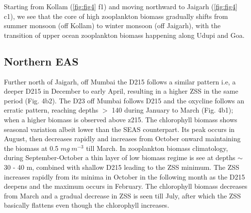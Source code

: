 \documentclass{article}
\begin{document}
	Starting from Kollam (\cref{fig:fig4} f1) and moving northward to Jaigarh (\cref{fig:fig4} c1), we see that the core of high zooplankton biomass gradually shifts from summer monsoon (off Kollam) to winter monsoon (off Jaigarh), with the transition of upper ocean zooplankton biomass happening along Udupi and Goa. 
	 
	\subsection{Northern EAS}
	Further north of Jaigarh, off Mumbai the D215 follows a similar pattern i.e, a deeper D215 in December to early April, resulting in a higher ZSS in the same period (Fig. 4b2). 	 The D23 off Mumbai follows D215 and the oxycline follows an erratic pattern, reaching depths $>$ 140 during January to March (Fig. 4b1); when a higher biomass is observed above z215. The chlorophyll biomass shows seasonal variation albeit lower than the SEAS counterpart. Its peak occurs in August, then decreases rapidly and increases from October onward maintaining the biomass at 0.5 $mg\ m^{-3}$ till March. In zooplankton biomass climatology, during September-October a thin layer of low biomass regime is see at depths $\sim$30 - 40 m, combined with shallow D215 leading to the ZSS minimum. The ZSS increases rapidly from its minima in October in the following month as the D215 deepens and the maximum occurs in February. The chlorophyll biomass decreases from March and a gradual decrease in ZSS is seen till July, after which the ZSS basically flattens even though the chlorophyll increases. 
	
	 
\end{document}

